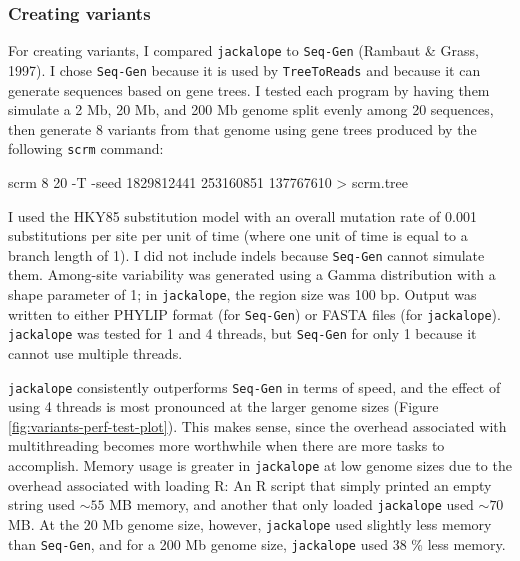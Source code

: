 \documentclass[12pt,]{article}
\newenvironment{Shaded}{}{}
\newcommand{\ExtensionTok}[1]{#1}
\newcommand{\NormalTok}[1]{#1}
\newcommand{\OperatorTok}[1]{#1}
\begin{document}
\hypertarget{creating-variants-1}{%
\subsubsection{Creating variants}\label{creating-variants-1}}

For creating variants, I compared \texttt{jackalope} to \texttt{Seq-Gen}
(Rambaut \& Grass, 1997).
I chose \texttt{Seq-Gen} because it is used by \texttt{TreeToReads} and because it can generate
sequences based on gene trees.
I tested each program by having them simulate a 2 Mb, 20 Mb, and 200 Mb genome
split evenly among 20 sequences, then generate 8 variants from that genome using
gene trees produced by the following \texttt{scrm} command:

\begin{Shaded}
\begin{Highlighting}[]
\ExtensionTok{scrm}\NormalTok{ 8 20 -T -seed 1829812441 253160851 137767610 }\OperatorTok{>}\NormalTok{ scrm.tree}
\end{Highlighting}
\end{Shaded}

I used the HKY85 substitution model
with an overall mutation rate of 0.001 substitutions per site per unit of time
(where one unit of time is equal to a branch length of 1).
I did not include indels because \texttt{Seq-Gen} cannot simulate them.
Among-site variability was generated using a Gamma distribution with a shape
parameter of 1; in \texttt{jackalope}, the region size was 100 bp.
Output was written to either PHYLIP format (for \texttt{Seq-Gen}) or
FASTA files (for \texttt{jackalope}).
\texttt{jackalope} was tested for 1 and 4 threads, but
\texttt{Seq-Gen} for only 1 because it cannot use multiple threads.

\texttt{jackalope} consistently outperforms \texttt{Seq-Gen} in terms of speed, and the effect
of using 4 threads is most pronounced at the larger genome sizes
(Figure \ref{fig:variants-perf-test-plot}).
This makes sense, since the overhead associated with multithreading becomes more
worthwhile when there are more tasks to accomplish.
Memory usage is greater in \texttt{jackalope} at low genome sizes due to the overhead
associated with loading R:
An R script that simply printed an empty string used \(\sim 55\) MB memory,
and another that only loaded \texttt{jackalope} used \(\sim 70\) MB.
At the 20 Mb genome size, however, \texttt{jackalope} used slightly less memory than \texttt{Seq-Gen},
and for a 200 Mb genome size, \texttt{jackalope} used 38 \% less memory.
\end{document}
